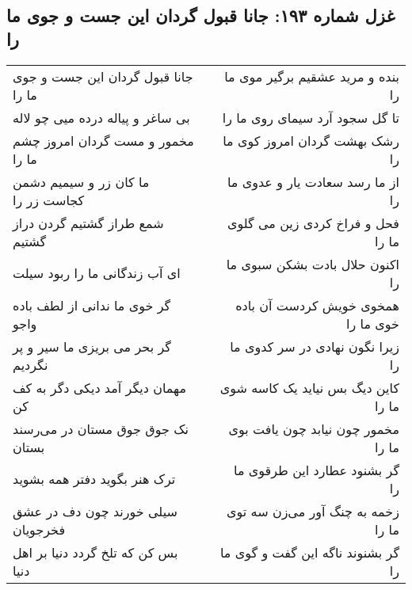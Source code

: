 \begin{center}
\section*{غزل شماره ۱۹۳: جانا قبول گردان این جست و جوی ما را}
\label{sec:0193}
\begin{longtable}{l p{0.5cm} r}
جانا قبول گردان این جست و جوی ما را
&&
بنده و مرید عشقیم برگیر موی ما را
\\
بی ساغر و پیاله درده میی چو لاله
&&
تا گل سجود آرد سیمای روی ما را
\\
مخمور و مست گردان امروز چشم ما را
&&
رشک بهشت گردان امروز کوی ما را
\\
ما کان زر و سیمیم دشمن کجاست زر را
&&
از ما رسد سعادت یار و عدوی ما را
\\
شمع طراز گشتیم گردن دراز گشتیم
&&
فحل و فراخ کردی زین می گلوی ما را
\\
ای آب زندگانی ما را ربود سیلت
&&
اکنون حلال بادت بشکن سبوی ما را
\\
گر خوی ما ندانی از لطف باده واجو
&&
همخوی خویش کردست آن باده خوی ما را
\\
گر بحر می بریزی ما سیر و پر نگردیم
&&
زیرا نگون نهادی در سر کدوی ما را
\\
مهمان دیگر آمد دیکی دگر به کف کن
&&
کاین دیگ بس نیاید یک کاسه شوی ما را
\\
نک جوق جوق مستان در می‌رسند بستان
&&
مخمور چون نیابد چون یافت بوی ما را
\\
ترک هنر بگوید دفتر همه بشوید
&&
گر بشنود عطارد این طرقوی ما را
\\
سیلی خورند چون دف در عشق فخرجویان
&&
زخمه به چنگ آور می‌زن سه توی ما را
\\
بس کن که تلخ گردد دنیا بر اهل دنیا
&&
گر بشنوند ناگه این گفت و گوی ما را
\\
\end{longtable}
\end{center}
